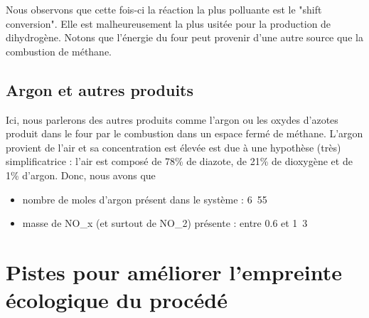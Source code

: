 Nous observons que cette fois-ci la réaction la plus polluante est le "shift conversion". Elle est malheureusement la plus usitée pour la production de dihydrogène. Notons que l'énergie du four peut provenir d'une autre source que la combustion de méthane.

\subsection{Argon et autres produits}

Ici, nous parlerons des autres produits comme l'argon ou les oxydes d'azotes produit dans le four par le combustion dans un espace fermé de méthane. L'argon provient de l'air et sa concentration est élevée est due à une hypothèse (très) simplificatrice : l'air est composé de 78\% de diazote, de 21\% de dioxygène et de 1\% d'argon. Donc, nous avons que
\begin{itemize}
	\item nombre de moles d'argon présent dans le système : \unit{6.55}{\mol\per\second}
	\item masse de NO_{x} (et surtout de NO_{2}) présente : entre 0.6 et \unit{1.3}{\tons\per\second}
\end{itemize}

\section{Pistes pour améliorer l'empreinte écologique du procédé}
%

